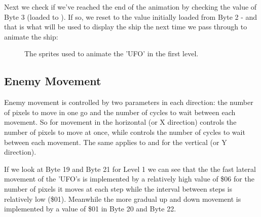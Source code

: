 %


Next we check if we've reached the end of the animation by checking the value
of Byte 3 (loaded to ).  If so,
we reset  to the value initially
loaded from Byte 2 - and that is what will be used to display the ship the next
time we pass through to animate the ship:

%


\begin{figure}[H]
  {
    \setlength{\tabcolsep}{3.0pt}
    \setlength\cmidrulewidth{\heavyrulewidth} %
	\centering
	\def\MULTICOLORONE{green}
	\def\MULTICOLORTWO{red}
	\def\SPRITECOLOR{blue}
	\begin{subfigure}{0.3\textwidth}
		
	\end{subfigure}
	\begin{subfigure}{0.3\textwidth}
		
	\end{subfigure}
	\begin{subfigure}{0.3\textwidth}
		
	\end{subfigure}
  }\caption[position=top]{The sprites used to animate the 'UFO' in the first level.}
\end{figure}

\subsection{Enemy Movement}

Enemy movement is controlled by two parameters in each direction: the number of pixels to move in one go and the number of
cycles to wait between each movement. So for movement in the horizontal (or X direction)  controls the number
of pixels to move at once, while  controls the number of cycles to wait between each movement. The same
applies to  and  for the vertical (or Y direction).

If we look at Byte 19 and Byte 21 for Level 1 we can see that the the fast lateral movement of the 'UFO's is implemented by a relatively
high value of \$06 for the number of pixels it moves at each step while the interval between steps is relatively low (\$01).
Meanwhile the more gradual up and down movement is implemented by a value of \$01 in Byte 20 and Byte 22.

